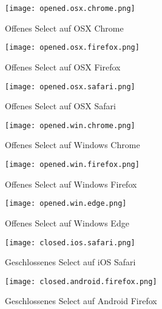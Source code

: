 
\begin{figure}[!htb]
    \centering
    \begin{minipage}[b]{0.28\textwidth}
        \centering
        \texttt{[image: opened.osx.chrome.png]}
        \caption{\centering Offenes Select auf OSX Chrome}
        \label{img:openedOsxChromeSelect}
    \end{minipage}
    \hfill
    \begin{minipage}[b]{0.28\textwidth}
        \centering
        \texttt{[image: opened.osx.firefox.png]}
        \caption{\centering Offenes Select auf OSX Firefox}
        \label{img:openedOsxFirefoxSelect}
    \end{minipage}
    \hfill
    \begin{minipage}[b]{0.28\textwidth}
        \centering
        \texttt{[image: opened.osx.safari.png]}
        \caption{\centering Offenes Select auf OSX Safari}
        \label{img:openedOsxSafariSelect}
    \end{minipage}
\end{figure}

\begin{figure}[!htb]
    \centering
    \begin{minipage}[b]{0.28\textwidth}
        \centering
        \texttt{[image: opened.win.chrome.png]}
        \caption{\centering Offenes Select auf Windows Chrome}
        \label{img:openedWinChromeSelect}
    \end{minipage}
    \hfill
    \begin{minipage}[b]{0.28\textwidth}
        \centering
        \texttt{[image: opened.win.firefox.png]}
        \caption{\centering Offenes Select auf Windows Firefox}
        \label{img:openedWinFirefoxSelect}
    \end{minipage}
    \hfill
    \begin{minipage}[b]{0.28\textwidth}
        \centering
        \texttt{[image: opened.win.edge.png]}
        \caption{\centering Offenes Select auf Windows Edge}
        \label{img:openedWinEdgeSelect}
    \end{minipage}
\end{figure}


\begin{figure}[!htb]
    \centering
    \begin{minipage}[b]{0.45\textwidth}
        \centering
        \texttt{[image: closed.ios.safari.png]}
        \caption{\centering Geschlossenes Select auf iOS Safari}
        \label{img:closedIosSafariSelect}
    \end{minipage}
    \hfill
    \begin{minipage}[b]{0.45\textwidth}
        \centering
        \texttt{[image: closed.android.firefox.png]}
        \caption{\centering Geschlossenes Select auf Android Firefox}
        \label{img:closedAndroidFirefoxSelect}
    \end{minipage}
\end{figure}

